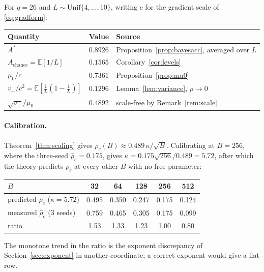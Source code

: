 \documentclass{article}
\theoremstyle{plain}
\theoremstyle{definition}
\theoremstyle{remark}
\newcommand{\E}{\mathbb{E}}
\newcommand{\1}{\mathbf{1}}
\begin{document}
For $q = 26$ and $L\sim\mathrm{Unif}\{4,\dots,10\}$, writing $c$ for the gradient
scale of \eqref{eq:gradform}:
\begin{center}
\begin{tabular}{lll}
\toprule
Quantity & Value & Source \\
\midrule
$\bar A^\star$ & $0.8926$ & Proposition~\ref{prop:bayesacc}, averaged over $L$ \\
$A_{\mathrm{chance}} = \E[1/L]$ & $0.1565$ & Corollary~\ref{cor:levels} \\
$\mu_0/c$ & $0.7361$ & Proposition~\ref{prop:mu0} \\
$v_+/c^2 = \E[\tfrac1L(1-\tfrac1L)]$ & $0.1296$ & Lemma~\ref{lem:variance}, $\rho\to0$ \\
$\sqrt{v_+}/\mu_0$ & $0.4892$ & scale-free by Remark~\ref{rem:scale} \\
\bottomrule
\end{tabular}
\end{center}

\paragraph{Calibration.}
Theorem~\ref{thm:scaling} gives $\rho_c(B)\approx0.489\,\kappa/\sqrt B$.
Calibrating at $B = 256$, where the three-seed $\hat\rho_c = 0.175$, gives
$\kappa = 0.175\sqrt{256}/0.489 = 5.72$, after which the theory predicts $\rho_c$
at every other $B$ with no free parameter:
\begin{center}
\begin{tabular}{lccccc}
\toprule
$B$ & 32 & 64 & 128 & 256 & 512 \\
\midrule
predicted $\rho_c$ ($\kappa = 5.72$) & 0.495 & 0.350 & 0.247 & 0.175 & 0.124 \\
measured $\hat\rho_c$ (3 seeds) & 0.759 & 0.465 & 0.305 & 0.175 & 0.099 \\
ratio & 1.53 & 1.33 & 1.23 & 1.00 & 0.80 \\
\bottomrule
\end{tabular}
\end{center}
The monotone trend in the ratio is the exponent discrepancy of
Section~\ref{sec:exponent} in another coordinate; a correct exponent would give a
flat row.
\end{document}
